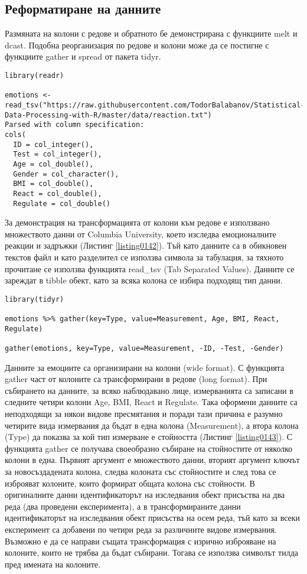 \subsection{Реформатиране на данните}

Размяната на колони с редове и обратното бе демонстрирана с функциите melt и dcast. Подобна реорганизация по редове и колони може да се постигне с функциите gather и spread от пакета tidyr. 

\begin{lstlisting}[caption=Данни за реакциите, label=listing0142]
library(readr)

emotions <- read_tsv("https://raw.githubusercontent.com/TodorBalabanov/Statistical-Data-Processing-with-R/master/data/reaction.txt")
Parsed with column specification:
cols(
  ID = col_integer(),
  Test = col_integer(),
  Age = col_double(),
  Gender = col_character(),
  BMI = col_double(),
  React = col_double(),
  Regulate = col_double()
\end{lstlisting}

За демонстрация на трансформацията от колони към редове е използвано множеството данни от Columbia University, което изследва емоционалните реакции и задръжки (Листинг \ref{listing0142}). Тъй като данните са в обикновен текстов файл и като разделител се използва символа за табулация, за тяхното прочитане се използва функцията read\_tsv (Tab Separated Values). Данните се зареждат в tibble обект, като за всяка колона се избира подходящ тип данни. 

\begin{lstlisting}[caption=Свиване от колони в редове, label=listing0143]
library(tidyr)

emotions %>% gather(key=Type, value=Measurement, Age, BMI, React, Regulate)

gather(emotions, key=Type, value=Measurement, -ID, -Test, -Gender)
\end{lstlisting}

Данните за емоциите са организирани на колони (wide format). С функцията gather част от колоните са трансформирани в редове (long format). При събирането на данните, за всяко наблюдавано лице, измерванията са записани в следните четири колони Age, BMI, React и Regulate. Така оформени данните са неподходящи за някои видове пресмятания и поради тази причина е разумно четирите вида измервания да бъдат в една колона (Measurement), а втора колона (Type) да показва за кой тип измерване е стойността (Листинг \ref{listing0143}). С функцията gather се получава своеобразно събиране на стойностите от няколко колони в една. Първият аргумент е множеството данни, вторият аргумент ключът за новосъздадената колона, следва колоната със стойностите и след това се изброяват колоните, които формират общата колона със стойности. В оригиналните данни идентификаторът на изследвания обект присъства на два реда (два проведени експеримента), а в трансформираните данни идентификаторът на изследвания обект присъства на осем реда, тъй като за всеки експеримент са добавени по четири реда за различните видове измервания. Възможно е да се направи същата трансформация с изрично изброяване на колоните, които не трябва да бъдат събирани. Тогава се използва символът тилда пред имената на колоните. 

